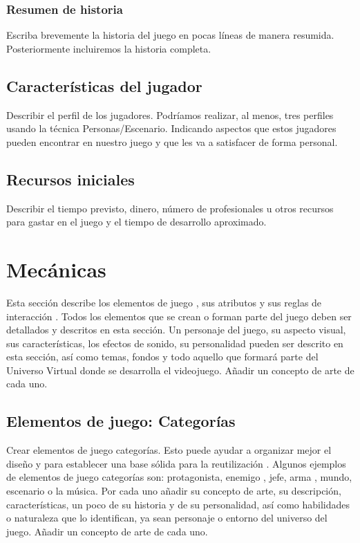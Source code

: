\subsubsection{Resumen de historia}
Escriba brevemente la historia del juego en pocas líneas de manera resumida. Posteriormente incluiremos la historia completa.

\subsection{Características del jugador}
Describir el perfil de los jugadores. Podríamos realizar, al menos, tres perfiles usando la técnica Personas/Escenario. Indicando aspectos que estos jugadores pueden encontrar en nuestro juego y que les va a satisfacer de forma personal.

\subsection{Recursos iniciales}
Describir el tiempo previsto, dinero, número de profesionales u otros recursos para gastar en el juego y el tiempo de desarrollo aproximado.


\section{Mecánicas}
Esta sección describe los elementos de juego , sus atributos y sus reglas de interacción . Todos los elementos que se crean o forman parte del juego deben ser detallados y descritos en esta sección. Un personaje del juego, su aspecto visual, sus características, los efectos de sonido, su personalidad pueden ser descrito en esta sección, así como temas, fondos y todo aquello que formará parte del Universo Virtual donde se desarrolla el videojuego. Añadir un concepto de arte de cada uno.

\subsection{Elementos de juego: Categorías}
Crear elementos de juego categorías. Esto puede ayudar a organizar mejor el diseño y para establecer una base sólida para la reutilización . Algunos ejemplos de elementos de juego categorías son: protagonista, enemigo , jefe, arma , mundo, escenario o la música. Por cada uno añadir su concepto de arte, su descripción, características, un poco de su historia y de su personalidad, así como habilidades o naturaleza que lo identifican, ya sean personaje o entorno del universo del juego. Añadir un concepto de arte de cada uno.

